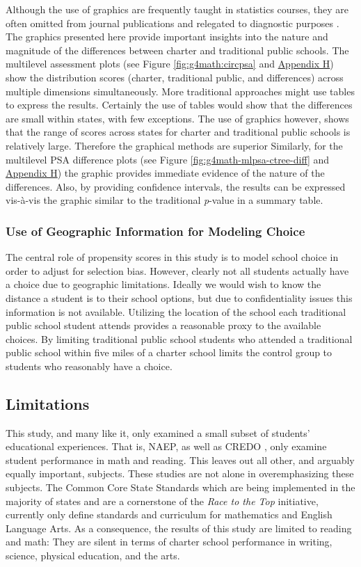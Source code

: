\documentclass[letterpaper,12pt]{article} %
\begin{document}
Although the use of graphics are frequently taught in statistics courses, they are often omitted from journal publications \cite{GelmanPasaricaDodhia2002} and relegated to diagnostic purposes \cite{Gelman2011}. The graphics presented here provide important insights into the nature and magnitude of the differences between charter and traditional public schools. The multilevel assessment plots (see Figure \ref{fig:g4math:circpsa} and \hyperref[appendixH]{Appendix H}) show the distribution scores (charter, traditional public, and differences) across multiple dimensions simultaneously. More traditional approaches might use tables to express the results. Certainly the use of tables would show that the differences are small within states, with few exceptions. The use of graphics however, shows that the range of scores across states for charter and traditional public schools is relatively large. Therefore the graphical methods are superior Similarly, for the multilevel PSA difference plots (see Figure \ref{fig:g4math-mlpsa-ctree-diff} and \hyperref[appendixH]{Appendix H}) the graphic provides immediate evidence of the nature of the differences. Also, by providing confidence intervals, the results can be expressed vis-\`{a}-vis the graphic similar to the traditional \textit{p}-value in a summary table.

\subsubsection{Use of Geographic Information for Modeling Choice}

The central role of propensity scores in this study is to model school choice in order to adjust for selection bias. However, clearly not all students actually have a choice due to geographic limitations. Ideally we would wish to know the distance a student is to their school options, but due to confidentiality issues this information is not available. Utilizing the location of the school each traditional public school student attends provides a reasonable proxy to the available choices. By limiting traditional public school students who attended a traditional public school within five miles of a charter school limits the control group to students who reasonably have a choice.

\subsection{Limitations}

This study, and many like it, only examined a small subset of students’ educational experiences. That is, NAEP, as well as CREDO \cite{credo,credo2013}, only examine student performance in math and reading. This leaves out all other, and arguably equally important, subjects. These studies are not alone in overemphasizing these subjects. The Common Core State Standards which are being implemented in the majority of states and are a cornerstone of the \textit{Race to the Top} initiative, currently only define standards and curriculum for mathematics and English Language Arts. As a consequence, the results of this study are limited to reading and math: They are silent in terms of charter school performance in writing, science, physical education, and the arts.
\end{document}
